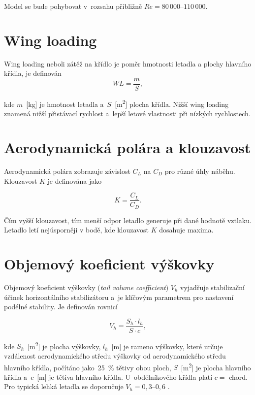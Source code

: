 \documentclass[12pt, a4paper, oneside]{report}
\newcommand{\Rey}{\mathit{Re}}
\begin{document}
Model se bude pohybovat v~rozsahu přibližně $\Rey = 80\,000$--$110\,000$.

\section{Wing loading}

Wing loading neboli zátěž na křídlo je poměr hmotnosti letadla a plochy hlavního křídla, je definován
\begin{equation}
    WL = \frac{m}{S},
    \label{eq:WL}
\end{equation}

kde $m$~[\si{\kilogram}] je hmotnost letadla a~$S$~[\si{\square\metre}] plocha
křídla. Nižší wing loading znamená nižší přistávací rychlost a~lepší
letové vlastnosti při nízkých rychlostech.

\section{Aerodynamická polára a klouzavost}

Aerodynamická polára zobrazuje závislost $C_L$ na $C_D$ pro různé úhly náběhu.
Klouzavost $K$ je definována jako

\begin{equation}
    K = \frac{C_L}{C_D} .
\end{equation}

Čím vyšší klouzavost, tím menší odpor letadlo generuje při dané hodnotě vztlaku.
Letadlo letí nejúsporněji v bodě, kde klouzavost $K$ dosahuje maxima.

\section{Objemový koeficient výškovky}

Objemový koeficient výškovky (\textit{tail volume coefficient}) $V_h$ vyjadřuje
stabilizační účinek horizontálního stabilizátoru a~je klíčovým parametrem
pro nastavení podélné stability. Je definován rovnicí

\begin{equation}
    V_h = \frac{S_h \cdot l_h}{S \cdot c} ,
    \label{eq:Vh}
\end{equation}

kde $S_h$~[\si{\square\metre}] je plocha výškovky, $l_h$~[\si{\metre}] je rameno
výškovky, které určuje vzdálenost aerodynamického středu výškovky od aerodynamického středu
hlavního křídla, počítáno jako~25~\% tětivy obou ploch, $S$~[\si{\square\metre}]
je plocha hlavního křídla a~$c$~[\si{\metre}] je tětiva hlavního křídla.
U~obdélníkového křídla platí $c = $ chord. Pro typická lehká letadla
se doporučuje $V_h = 0{,}3$--$0{,}6$ \cite{drela_lab8}. 
\end{document}
